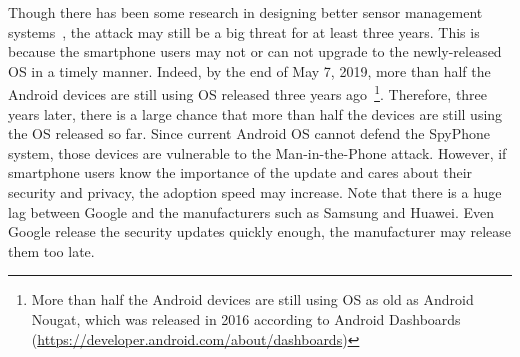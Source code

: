 Though there has been some research in designing better sensor management systems~\cite{sikder20176thsense}, the {\attackName} attack may still be a big threat for at least three years. This is because the smartphone users may not or can not upgrade to the 
newly-released OS in a timely manner. 
%
Indeed, by the end of May 7, 2019, more than half the Android devices are still using OS released three years ago~\footnote{More than half the Android devices are still using OS as old as Android Nougat, which was released in 2016 according to Android Dashboards (\url{https://developer.android.com/about/dashboards})}. Therefore, three years later, there is a large chance that more than half the devices are still using the OS released so far. Since current Android OS cannot defend the SpyPhone system, those devices are vulnerable to the Man-in-the-Phone attack. However, if smartphone users know the importance of the update and cares about their security and privacy, the adoption speed may increase. Note that there is a huge lag between Google and the manufacturers such as Samsung and Huawei. Even Google release the security updates quickly enough, the manufacturer may release them too late.

